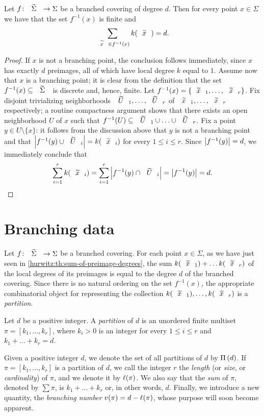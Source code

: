 \begin{proposition}\label{hurwitz:th:sum-of-preimage-degrees}
Let $\map{f}{\tSigma}{\Sigma}$ be a branched covering of degree $d$. Then for every point $x\in\Sigma$ we have that the set $f^{-1}(x)$ is finite and
\[
\sum_{\wtilde{x}\in f^{-1}(x)}k(\wtilde{x})=d.
\]
\end{proposition}
\begin{proof}
If $x$ is not a branching point, the conclusion follows immediately, since $x$ has exactly $d$ preimages, all of which have local degree $k$ equal to $1$. Assume now that $x$ is a branching point; it is clear from the definition that the set $f^{-1}(x)\subs\tSigma$ is discrete and, hence, finite. Let $f^{-1}(x)=\{\wtilde{x}_1,\ldots,\wtilde{x}_r\}$. Fix disjoint trivializing neighborhoods $\wtilde{U}_1,\ldots,\wtilde{U}_r$ of $\wtilde{x}_1,\ldots,\wtilde{x}_r$ respectively; a routine compactness argument shows that there exists an open neighborhood $U$ of $x$ such that $f^{-1}(U)\subs \wtilde{U}_1\cup\ldots\cup\wtilde{U}_r$. Fix a point $y\in U\setminus\{x\}$: it follows from the discussion above that $y$ is not a branching point and that $\card{f^{-1}(y)\cup\wtilde{U}_i}=k(\wtilde{x}_i)$ for every $1\le i\le r$. Since $\left\lvert f^{-1}(y)\right\rvert=d$, we immediately conclude that
\[
\sum_{i=1}^r k(\wtilde{x}_i)=\sum_{i=1}^r\card{f^{-1}(y)\cap\wtilde{U}_i}=\card{f^{-1}(y)}=d.\qedhere
\]
\end{proof}

\section{Branching data}

Let $\map{f}{\tSigma}{\Sigma}$ be a branched covering. For each point $x\in\Sigma$, as we have just seen in \cref{hurwitz:th:sum-of-preimage-degrees}, the sum $k(\wtilde{x}_1)+\ldots k(\wtilde{x}_r)$ of the local degrees of its preimages is equal to the degree $d$ of the branched covering. Since there is no natural ordering on the set $f^{-1}(x)$, the appropriate combinatorial object for representing the collection $k(\wtilde{x}_1),\ldots,k(\wtilde{x}_r)$ is a \emph{partition}.

\begin{definition}
Let $d$ be a positive integer. A \emph{partition} of $d$ is an unordered finite multiset $\pi=[k_1,\ldots,k_r]$, where $k_i>0$ is an integer for every $1\le i\le r$ and $k_1+\ldots+k_r=d$.
\end{definition}

Given a positive integer $d$, we denote the set of all partitions of $d$ by $\Pi\left(d\right)$. If $\pi=[k_1,\ldots,k_r]$ is a partition of $d$, we call the integer $r$ the \emph{length} (or \emph{size}, or \emph{cardinality}) of $\pi$, and we denote it by $\ell(\pi)$. We also say that the \emph{sum} of $\pi$, denoted by $\sum\pi$, is $k_1+\ldots+k_r$ or, in other words, $d$. Finally, we introduce a new quantity, the \emph{branching number} $v(\pi)=d-\ell(\pi)$, whose purpose will soon become apparent.

